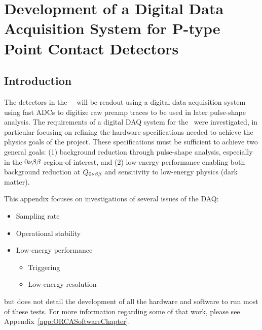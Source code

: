 %
%

\chapter{Development of a Digital Data Acquisition System for P-type Point Contact Detectors}
\label{chap:DAQDevel}
	\section{Introduction} 
	
	The detectors in the \MJ~\minmod~will be readout using a digital data acquisition system using fast ADCs to digitize raw preamp traces to be used in later pulse-shape analysis.  The requirements of a digital DAQ system for the \minmod~were investigated, in particular focusing on refining the hardware specifications needed to achieve the physics goals of the project.  These specifications must be sufficient to achieve two general goals: (1) background reduction through pulse-shape analysis, especially in the $0 \nu \beta \beta$ region-of-interest, and (2) low-energy performance enabling both background reduction at $Q_{0 \nu \beta \beta}$ and sensitivity to low-energy physics (dark matter).  
	
	 This appendix focuses on investigations of several issues of the DAQ:
		\begin{itemize}
			\item Sampling rate 
			\item Operational stability
			\item Low-energy performance
			\begin{itemize}
				\item Triggering
				\item Low-energy resolution
			\end{itemize}	
		\end{itemize}
but does not detail the development of all the hardware and software to run most of these tests.  For more information regarding some of that work, please see Appendix~\ref{app:ORCASoftwareChapter}.  %

